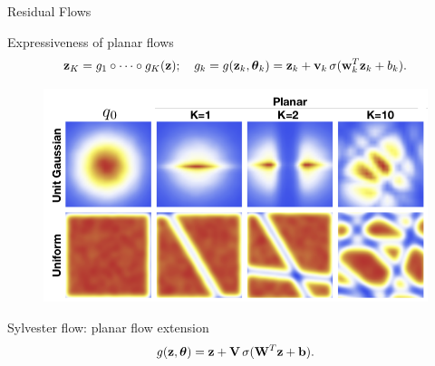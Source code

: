 \begin{frame}{Residual Flows}
	\begin{block}{Expressiveness of planar flows}
		\vspace{-0.5cm}
		\[
		\mathbf{z}_K = g_1 \circ \dots \circ g_K (\mathbf{z}); \quad g_k = g(\mathbf{z}_k, \boldsymbol{\theta}_k) = \mathbf{z}_k + \mathbf{v}_k\, \sigma(\mathbf{w}_k^T\mathbf{z}_k + b_k).
		\]
		\vspace{-0.8cm}
		\begin{figure}
			\centering
			\includegraphics[width=0.7\linewidth]{figs/planar_flows.png}
		\end{figure}
		\vspace{-0.5cm}
	\end{block}
	\begin{block}{Sylvester flow: planar flow extension}
		\vspace{-0.3cm}
		\[
		g(\mathbf{z}, \boldsymbol{\theta}) = \mathbf{z} + \mathbf{V} \, \sigma(\mathbf{W}^T\mathbf{z} + \mathbf{b}).
		\]
	\end{block}
\end{frame}
